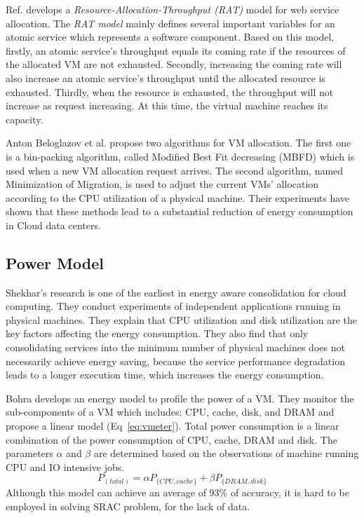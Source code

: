 Ref. \cite{Service_1} develops a \textit{Resource-Allocation-Throughput (RAT)} model for web service allocation. The \textit{RAT model} mainly defines several important variables for an atomic service which represents a software component. Based on this model, firstly, an atomic service's throughput equals its coming rate if the resources of the allocated VM are not exhausted. Secondly, increasing the coming rate will also increase an atomic service's throughput until the allocated resource is exhausted. Thirdly, when the resource is exhausted, the throughput will not increase as request increasing. At this time, the virtual machine reaches its capacity. 

Anton Beloglazov et al.  \cite{Energy_Service_2} propose two algorithms for VM allocation. The first one is a bin-packing algorithm, called Modified Best Fit decreasing (MBFD) which is used when a new VM allocation request arrives. The second algorithm, named Minimization of Migration, is used to adjust the current VMs’ allocation according to the CPU utilization of a physical machine. Their experiments have shown that these methods lead to a substantial reduction of energy consumption in Cloud data centers.

\subsection{Power Model}

Shekhar's research \cite{Energy_1} is one of the earliest in energy aware consolidation for cloud computing. They conduct experiments of independent applications running in physical machines. They explain that CPU utilization and disk utilization are the key factors affecting the energy consumption. They also find that only consolidating services into the minimum number of physical machines does not necessarily achieve energy saving, because the service performance degradation leads to a longer execution time, which increases the energy consumption. 

Bohra \cite{Energy_3} develops an energy model to profile the power of a VM. They monitor the sub-components of a VM which includes: CPU, cache, disk, and DRAM and propose a linear model (Eq~\ref{eq:vmeter}). 
Total power consumption is a linear combination of the power consumption of CPU, cache, DRAM and disk. The parameters
$\alpha$ and $\beta$ are determined based on the observations of machine running CPU and IO intensive jobs. 
\begin{equation}
\label{eq:vmeter}
  P_{(total)} = \alpha P_{\{CPU, cache\}} + \beta P_{\{DRAM, disk\}}
\end{equation}
Although this model can achieve an average of 93\% of accuracy, it is hard to be employed in solving SRAC problem, for the lack of data.

